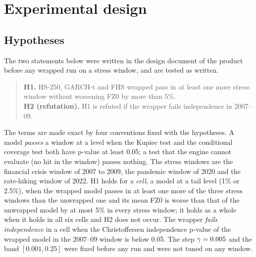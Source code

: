 \section{Experimental design}
\label{sec:experimental-design}

\subsection{Hypotheses}
\label{sec:design-hypotheses}

The two statements below were written in the design document of the product before any wrapped run on a stress window, and are tested as written.

\begin{quote}
\textbf{H1.} HS-250, GARCH-t and FHS wrapped pass in at least one more stress window without worsening FZ0 by more than 5\%.\\
\textbf{H2 (refutation).} H1 is refuted if the wrapper fails independence in 2007--09.
\end{quote}

The terms are made exact by four conventions fixed with the hypotheses. A model \emph{passes} a window at a level when the Kupiec test and the conditional coverage test both have p-value at least 0.05; a test that the engine cannot evaluate (no hit in the window) passes nothing. The stress windows are the financial crisis window of 2007 to 2009, the pandemic window of 2020 and the rate-hiking window of 2022. H1 holds for a \emph{cell}, a model at a tail level (1\% or 2.5\%), when the wrapped model passes in at least one more of the three stress windows than the unwrapped one and its mean FZ0 is worse than that of the unwrapped model by at most 5\% in every stress window; it holds as a whole when it holds in all six cells and H2 does not occur. The wrapper \emph{fails independence} in a cell when the Christoffersen independence p-value of the wrapped model in the 2007--09 window is below 0.05. The step $\gamma = 0.005$ and the band $[0.001, 0.25]$ were fixed before any run and were not tuned on any window.

